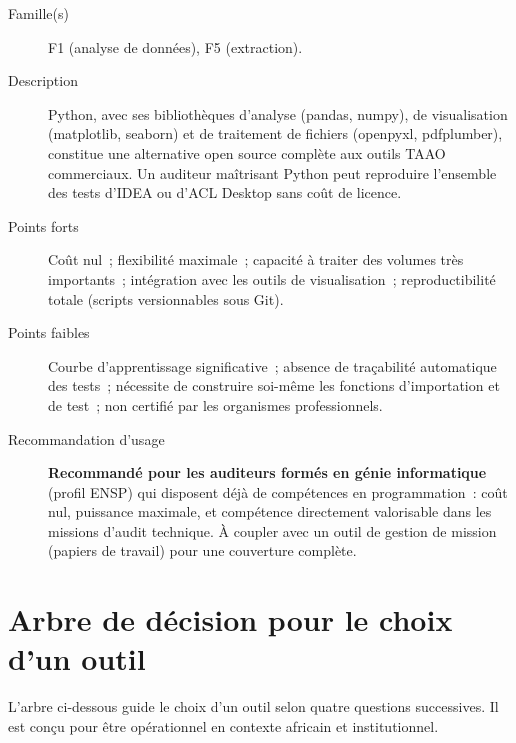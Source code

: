 \begin{description}
  \item[Famille(s)] F1 (analyse de données), F5 (extraction).
  \item[Description] Python, avec ses bibliothèques d'analyse (pandas,
        numpy), de visualisation (matplotlib, seaborn) et de traitement
        de fichiers (openpyxl, pdfplumber), constitue une alternative
        open source complète aux outils TAAO commerciaux. Un auditeur
        maîtrisant Python peut reproduire l'ensemble des tests d'IDEA ou
        d'ACL Desktop sans coût de licence.
  \item[Points forts] Coût nul~; flexibilité maximale~; capacité à traiter
        des volumes très importants~; intégration avec les outils de
        visualisation~; reproductibilité totale (scripts versionnables sous
        Git).
  \item[Points faibles] Courbe d'apprentissage significative~; absence
        de traçabilité automatique des tests~; nécessite de construire
        soi-même les fonctions d'importation et de test~; non certifié
        par les organismes professionnels.
  \item[Recommandation d'usage] \textbf{Recommandé pour les auditeurs
        formés en génie informatique} (profil ENSP) qui disposent déjà
        de compétences en programmation~: coût nul, puissance maximale,
        et compétence directement valorisable dans les missions d'audit
        technique. À coupler avec un outil de gestion de mission (papiers
        de travail) pour une couverture complète.
\end{description}

\section{Arbre de décision pour le choix d'un outil}
\label{sec:arbre-decision-outils}

L'arbre ci-dessous guide le choix d'un outil selon quatre questions
successives. Il est conçu pour être opérationnel en contexte africain
et institutionnel.

